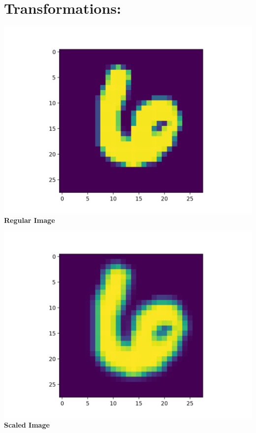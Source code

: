 \documentclass[12pt, letterpaper, notitlepage, twoside]{article}
\theoremstyle{definition}
\theoremstyle{plain}
\begin{document}
\section{Transformations:}
\begin{center}
    


    \includegraphics{Imgs/6.png}
    \textbf{Regular Image}

    \includegraphics{Imgs/6_big.png}
    \textbf{Scaled Image}


\end{center}
\end{document}
